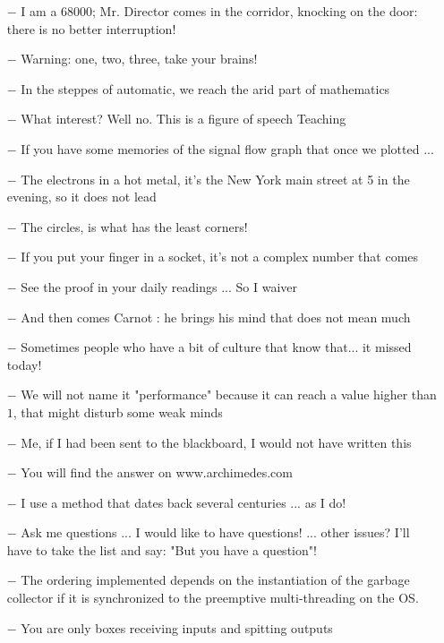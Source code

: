 \begin{itemize}
	\item[$-$] I am a 68000; Mr. Director comes in the corridor, knocking on the door: there is no better interruption! 
	\item[$-$] Warning: one, two, three, take your brains!
	\item[$-$] In the steppes of automatic, we reach the arid part of mathematics 
	\item[$-$] What interest? Well no. This is a figure of speech Teaching 
	\item[$-$] If you have some memories of the signal flow graph that once we plotted ...
	\item[$-$] The electrons in a hot metal, it's the New York main street at 5 in the evening, so it does not lead
	\item[$-$] The circles, is what has the least corners!
	\item[$-$] If you put your finger in a socket, it's not a complex number that comes
	\item[$-$] See the proof in your daily readings ... So I waiver
	\item[$-$] And then comes Carnot : he brings his mind that does not mean much 
	\item[$-$] Sometimes people who have a bit of culture that know that... it missed today! 
	\item[$-$] We will not name it "performance" because it can reach a value higher than $1$, that might disturb some weak minds
	\item[$-$] Me, if I had been sent to the blackboard, I would not have written this 
	\item[$-$] You will find the answer on www.archimedes.com
	\item[$-$] I use a method that dates back several centuries ... as I do!
	\item[$-$] Ask me questions ... I would like to have questions! ... other issues? I'll have to take the list and say: "But you have a question"!
	\item[$-$] The ordering implemented depends on the instantiation of the garbage collector if it is synchronized to the preemptive multi-threading on the OS.
	\item[$-$] You are only boxes receiving inputs and spitting outputs
\end{itemize}

	\begin{center}\underline{\hspace{5 cm}}\end{center}
	
